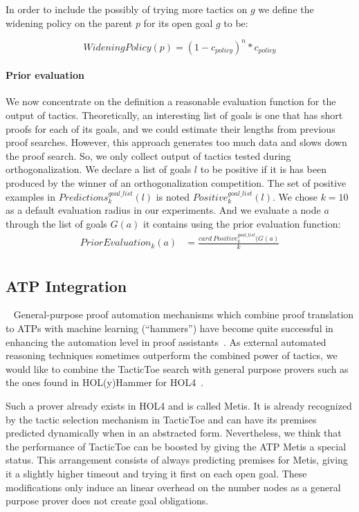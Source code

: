 \documentclass[runningheads,a4paper,draft]{svjour3}
\def\holfour{\textsf{HOL4}\xspace}
\def\holyhammer{\textsf{HOL(y)Hammer}\xspace}
\def\metis{\textsf{Metis}\xspace}
\def\tactictoe{\textsf{TacticToe}\xspace}
\begin{document}
In order to include the possibly of trying more tactics on $g$ we define the
widening policy on the parent $p$ for its open goal $g$ to be:

\[WideningPolicy(p) = (1 - c_{policy})^{n} * c_{policy}\]


\paragraph{Prior evaluation}\label{sec:evaluation}

We now concentrate on the definition a reasonable evaluation function for the
output of tactics. Theoretically, an interesting list of goals is one
that has short proofs for each of its goals, and we could estimate their 
lengths from previous proof searches. However, this
approach generates too much data and slows down the proof search. So, we only 
collect output of tactics tested during orthogonalization. We
declare a list of goals $l$ to be positive if it is has been produced by the
winner of an orthogonalization competition. 
The set of positive examples in 
$\mathit{Predictions}^{\mathit{goal\_list}}_k(l)$ is noted 
$\mathit{Positive}^{\mathit{goal\_list}}_k(l)$.
We chose $k=10$ as a default evaluation radius in our experiments.
And we evaluate a node $a$ through the list of goals $G(a)$ it
contains using the prior evaluation function:
\begin{align*}
\mathit{PriorEvaluation}_k (a) &= 
  \frac{card\ \mathit{Positive}^{\mathit{goal\_list}}_k(G(a)}{k}\\
\end{align*}


\subsection{ATP Integration}~\label{sec:atp}
General-purpose proof automation mechanisms which combine proof translation to
ATPs with machine learning (``hammers'') have become quite successful in
enhancing the automation level in proof assistants~\cite{hammers4qed}.
As external automated reasoning techniques sometimes outperform the combined
power of tactics, we would like to combine the \tactictoe search with
general purpose provers such as the ones found in \holyhammer for
\holfour~\cite{tgck-cpp15}.

Such a prover already exists in \holfour and is called \metis. It is already
recognized by the tactic selection mechanism in \tactictoe and can have its
premises predicted dynamically when in an abstracted form. Nevertheless,
we think that the performance of \tactictoe can be boosted by giving the ATP
\metis a special status. This arrangement consists of always predicting
premises for \metis, giving it a slightly higher timeout and
trying it first on each open goal. These modifications only induce an
linear overhead on the number nodes as a general purpose prover does not create
goal obligations.
\end{document}
